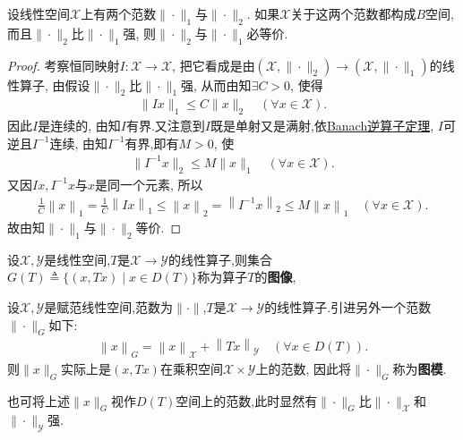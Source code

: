 \documentclass[../../main.tex]{subfiles}%
\begin{document}
\begin{corollary}[等价范数定理]\label{corollary:泛函分析--等价范数定理}
设线性空间$\mathscr{X}$上有两个范数$\|\cdot\|_1$与$\|\cdot\|_2$. 如果$\mathscr{X}$关于这两个范数都构成$B$空间, 而且$\|\cdot\|_2$比$\|\cdot\|_1$强, 则$\|\cdot\|_2$与$\|\cdot\|_1$必等价.
\end{corollary}
\begin{proof}

考察恒同映射$I:\mathscr{X}\to\mathscr{X}$, 把它看成是由$(\mathscr{X},\|\cdot\|_2)\to(\mathscr{X},\|\cdot\|_1)$的线性算子, 由假设$\|\cdot\|_2$比$\|\cdot\|_1$强, 从而由知$\exists C>0$, 使得
\begin{align*}
\|Ix\|_1 \leqslant C\|x\|_2 \quad (\forall x\in\mathscr{X}).
\end{align*}
因此$I$是连续的, 由知$I$有界.又注意到$I$既是单射又是满射,依\hyperref[theorem:泛函分析--Banach逆算子定理]{Banach逆算子定理}, $I$可逆且$I^{-1}$连续, 由知$I^{-1}$有界,即有$M>0$, 使
\begin{align*}
\|I^{-1}x\|_2 \leqslant M\|x\|_1 \quad (\forall x\in\mathscr{X}).
\end{align*}
又因$Ix,I^{-1}x$与$x$是同一个元素, 所以
\begin{align*}
\frac{1}{C}\left\| x \right\| _1=\frac{1}{C}\left\| Ix \right\| _1\leqslant \left\| x \right\| _2=\left\| I^{-1}x \right\| _2\leqslant M\left\| x \right\| _1\quad (\forall x\in \mathscr{X} ).
\end{align*}
故由知$\|\cdot\|_1$与$\|\cdot\|_2$等价.

\end{proof}

\begin{definition}
设$\mathscr{X},\mathscr{Y}$是线性空间,$T$是$\mathscr{X}\to\mathscr{Y}$的线性算子,则集合$G(T)\triangleq\{(x,Tx)\mid x\in D(T)\}$称为算子$T$的\textbf{图像}, 

设$\mathscr{X},\mathscr{Y}$是赋范线性空间,范数为$\|\cdot\|$,$T$是$\mathscr{X}\to\mathscr{Y}$的线性算子.引进另外一个范数$\|\cdot\|_G$如下:
\begin{align*}
\left\| x \right\| _G=\left\| x \right\| _{\mathscr{X}}+\left\| Tx \right\| _{\mathscr{Y}}\quad (\forall x\in D(T)).
\end{align*}
则$\|x\|_G$实际上是$(x,Tx)$在乘积空间$\mathscr{X}\times\mathscr{Y}$上的范数, 因此将$\|\cdot\|_G$称为\textbf{图模}. 
\end{definition}
\begin{remark}
也可将上述$\|x\|_G$视作$D(T)$空间上的范数,此时显然有$\|\cdot\|_G$比$\|\cdot\|_\mathscr{X}$和$\|\cdot\|_\mathscr{Y}$强.
\end{remark}
\end{document}

